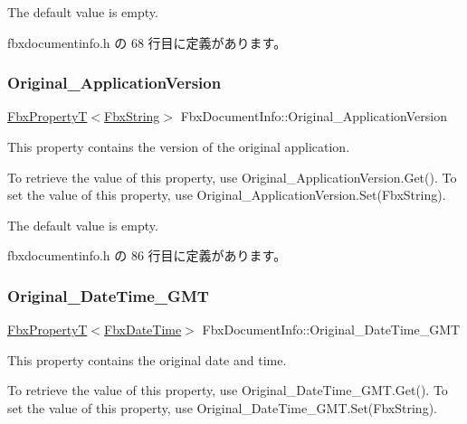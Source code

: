 The default value is empty. 

 fbxdocumentinfo.\+h の 68 行目に定義があります。

\mbox{\label{class_fbx_document_info_ab995992091af994047deccc609f1bcfd}} 
\subsubsection{\texorpdfstring{Original\+\_\+\+Application\+Version}{Original\_ApplicationVersion}}
{\footnotesize\ttfamily \hyperlink{class_fbx_property_t}{Fbx\+PropertyT}$<$\hyperlink{class_fbx_string}{Fbx\+String}$>$ Fbx\+Document\+Info\+::\+Original\+\_\+\+Application\+Version}

This property contains the version of the original application.

To retrieve the value of this property, use Original\+\_\+\+Application\+Version.\+Get(). To set the value of this property, use Original\+\_\+\+Application\+Version.\+Set(\+Fbx\+String).

The default value is empty. 

 fbxdocumentinfo.\+h の 86 行目に定義があります。

\mbox{\label{class_fbx_document_info_adbfedbef249bc1ef77e06ad01e5067c6}} 
\subsubsection{\texorpdfstring{Original\+\_\+\+Date\+Time\+\_\+\+G\+MT}{Original\_DateTime\_GMT}}
{\footnotesize\ttfamily \hyperlink{class_fbx_property_t}{Fbx\+PropertyT}$<$\hyperlink{class_fbx_date_time}{Fbx\+Date\+Time}$>$ Fbx\+Document\+Info\+::\+Original\+\_\+\+Date\+Time\+\_\+\+G\+MT}

This property contains the original date and time.

To retrieve the value of this property, use Original\+\_\+\+Date\+Time\+\_\+\+G\+M\+T.\+Get(). To set the value of this property, use Original\+\_\+\+Date\+Time\+\_\+\+G\+M\+T.\+Set(\+Fbx\+String).

